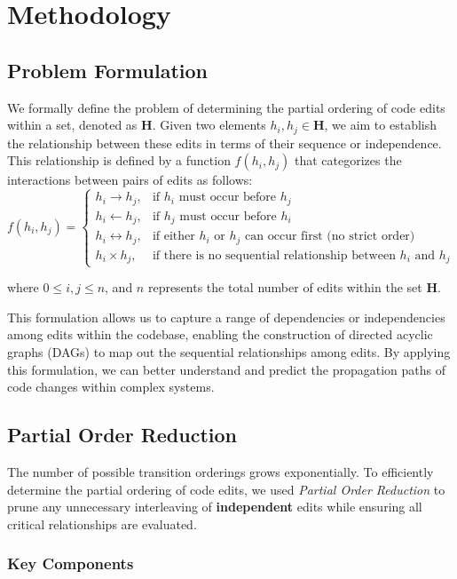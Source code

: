 \chapter{Methodology}

\section{Problem Formulation}

We formally define the problem of determining the partial ordering of code edits within a set, denoted as \(\mathbf{H}\). Given two elements \( h_i, h_j \in \mathbf{H} \), we aim to establish the relationship between these edits in terms of their sequence or independence. This relationship is defined by a function \( f(h_i, h_j) \) that categorizes the interactions between pairs of edits as follows:
\[
f(h_i, h_j) =
\begin{cases}
    h_i \rightarrow h_j, & \text{if } h_i \text{ must occur before } h_j \\
    h_i \leftarrow h_j, & \text{if } h_j \text{ must occur before } h_i \\
    h_i \leftrightarrow h_j, & \text{if either } h_i \text{ or } h_j \text{ can occur first (no strict order)} \\
    h_i \times h_j, & \text{if there is no sequential relationship between } h_i \text{ and } h_j
\end{cases}
\]

where \(0 \leq i, j \leq n\), and \(n\) represents the total number of edits within the set \(\mathbf{H}\).

This formulation allows us to capture a range of dependencies or independencies among edits within the codebase, enabling the construction of directed acyclic graphs (DAGs) to map out the sequential relationships among edits. By applying this formulation, we can better understand and predict the propagation paths of code changes within complex systems.

\newpage
\section{Partial Order Reduction}
The number of possible transition orderings grows exponentially. To efficiently determine the partial ordering of code edits, we used \textit{Partial Order Reduction} to prune any unnecessary interleaving of \textbf{independent} edits while ensuring all critical relationships are evaluated.

\subsection{Key Components}

